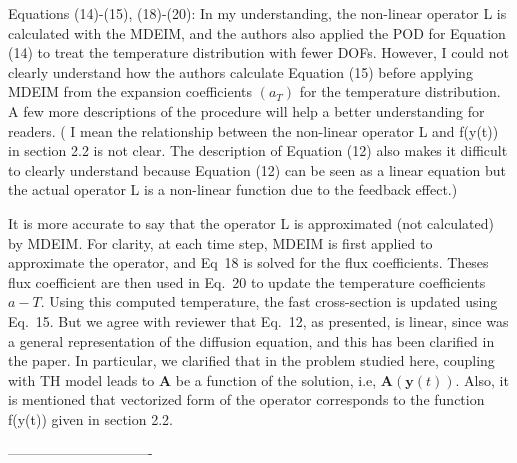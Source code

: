 \documentclass[10pt]{article}
\begin{document}
\begin{response}
	{
		Equations (14)-(15), (18)-(20):
		In my understanding, the non-linear operator L is calculated with the MDEIM, and the authors also applied the POD for Equation (14) to treat the temperature distribution with fewer DOFs.
		However, I could not clearly understand how the authors calculate Equation (15) before applying MDEIM from the expansion coefficients $(a_T)$ for the temperature distribution. A few more descriptions of the procedure will help a better understanding for readers.
		( I mean the relationship between the non-linear operator L and f(y(t)) in section 2.2 is not clear. The description of Equation (12) also makes it difficult to clearly understand because Equation (12) can be seen as a linear equation but the actual operator L is a non-linear function due to the feedback effect.)
	}

It is more accurate to say that the operator L is approximated (not calculated) by MDEIM.
For clarity, at each time step, MDEIM is first applied to approximate the operator, and Eq~18 is solved for the flux coefficients.
Theses flux coefficient are then used in Eq.~20 to update the temperature coefficients $a-T$.
Using this computed temperature, the fast cross-section is updated using Eq.~15.
But we agree with reviewer that Eq.~12, as presented, is linear, since was a general representation of the diffusion equation, and this has been clarified in the paper.
In particular, we clarified that in the problem studied here, coupling with TH model leads to $\textbf{A}$ be a function of the solution, i.e, $\textbf{A}(\textbf{y}(t))$.
Also, it is mentioned that vectorized form of the operator corresponds to the function f(y(t)) given in section 2.2.



\end{response}

-------------------------------
\end{document}
